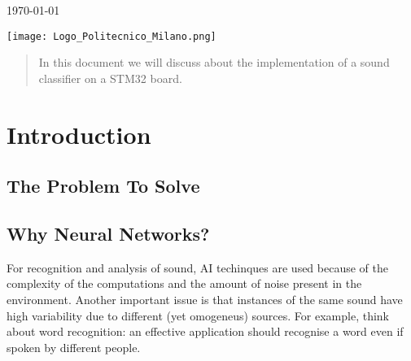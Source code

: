 \begin{titlepage}


{\large \today}\\[2cm] %




\begin{center}
	\texttt{[image: Logo\_Politecnico\_Milano.png]}                                               
\end{center}



\vfill %

\end{titlepage}




\begin{abstract}
In this document we will discuss about the implementation of a sound classifier on a STM32 board. %
\end{abstract}

\section{Introduction}

\subsection{The Problem To Solve}
\subsection{Why Neural Networks?}
For recognition and analysis of sound, AI techinques are used because of the complexity of the computations and the amount of noise present in the environment. Another important issue is that instances of the same sound have high variability due to different (yet omogeneus) sources. For example, think about word recognition: an effective application should recognise a word even if spoken by different people. 
